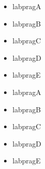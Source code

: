 \documentclass[a4paper]{article}%
\begin{document}
%
%


\begin{itemize}[labpragA]
\item%
    labpragA
\end{itemize}
\begin{itemize}[labpragB]
\item%
    labpragB
\end{itemize}
\begin{itemize}[labpragC]
\item%
    labpragC
\end{itemize}
\begin{itemize}[labpragD]
\item%
    labpragD
\end{itemize}
\begin{itemize}[labpragE]
\item%
    labpragE
\end{itemize}

\par\vspace{\baselineskip}
\begin{itemize}[labpragA]
\item%
    labpragA
\item[\labpragBsym]%
    labpragB
\item[\labpragCsym]%
    labpragC
\item[\labpragDsym]%
    labpragD
\item[\labpragEsym]%
    labpragE
\end{itemize}
\npi%





\end{document}
